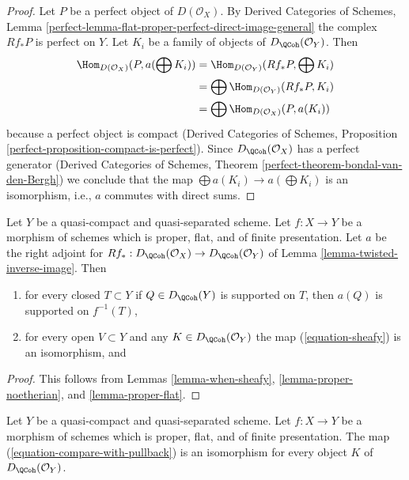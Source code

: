 \begin{proof}
Let $P$ be a perfect object of $D(\mathcal{O}_X)$. By
Derived Categories of Schemes, Lemma
\ref{perfect-lemma-flat-proper-perfect-direct-image-general}
the complex $Rf_*P$ is perfect on $Y$.
Let $K_i$ be a family of objects of $D_\QCoh(\mathcal{O}_Y)$.
Then
\begin{align*}
\Hom_{D(\mathcal{O}_X)}(P, a(\bigoplus K_i))
& =
\Hom_{D(\mathcal{O}_Y)}(Rf_*P, \bigoplus K_i) \\
& =
\bigoplus \Hom_{D(\mathcal{O}_Y)}(Rf_*P, K_i) \\
& =
\bigoplus \Hom_{D(\mathcal{O}_X)}(P, a(K_i))
\end{align*}
because a perfect object is compact (Derived Categories of Schemes,
Proposition \ref{perfect-proposition-compact-is-perfect}).
Since $D_\QCoh(\mathcal{O}_X)$ has a perfect generator
(Derived Categories of Schemes, Theorem
\ref{perfect-theorem-bondal-van-den-Bergh})
we conclude that the map $\bigoplus a(K_i) \to a(\bigoplus K_i)$
is an isomorphism, i.e., $a$ commutes with direct sums.
\end{proof}

\begin{lemma}
\label{lemma-proper-flat-relative}
Let $Y$ be a quasi-compact and quasi-separated scheme.
Let $f : X \to Y$ be a morphism of schemes which is proper, flat, and
of finite presentation.
Let $a$ be the right adjoint for
$Rf_* : D_\QCoh(\mathcal{O}_X) \to D_\QCoh(\mathcal{O}_Y)$ of
Lemma \ref{lemma-twisted-inverse-image}. Then
\begin{enumerate}
\item for every closed $T \subset Y$ if $Q \in D_\QCoh(Y)$ is supported on $T$,
then $a(Q)$ is supported on $f^{-1}(T)$,
\item for every open $V \subset Y$ and any $K \in D_\QCoh(\mathcal{O}_Y)$
the map (\ref{equation-sheafy}) is an isomorphism, and
\end{enumerate}
\end{lemma}

\begin{proof}
This follows from Lemmas \ref{lemma-when-sheafy},
\ref{lemma-proper-noetherian}, and
\ref{lemma-proper-flat}.
\end{proof}

\begin{lemma}
\label{lemma-compare-with-pullback-flat-proper}
Let $Y$ be a quasi-compact and quasi-separated scheme.
Let $f : X \to Y$ be a morphism of schemes which is proper, flat, and
of finite presentation.
The map (\ref{equation-compare-with-pullback}) is an isomorphism
for every object $K$ of $D_\QCoh(\mathcal{O}_Y)$.
\end{lemma}


